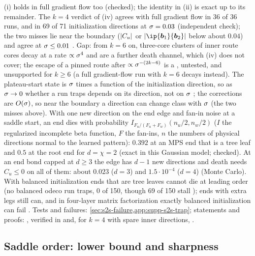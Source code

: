 (i) holds in full gradient flow too (checked); the identity in (ii) is exact up to its remainder. The $k=4$ verdict
of (iv) agrees with full gradient flow in 36 of 36 runs, and in 69 of 71 initialization directions at $\sigma=0.03$
(independent check); the two misses lie near the boundary ($\lvert C_u\rvert$ or $\abs{\ip{\boldsymbol b_1}{\boldsymbol b_2}}$
below about $0.04$) and agree at $\sigma\le0.01$ \empirical. Gap: from
$k=6$ on, three-core clusters of inner route cores decay at a rate $\propto\sigma^4$ and are a further death
channel, which (iv) does not cover; the escape of a pinned route after $\propto\sigma^{-(2k-6)}$ is a \conjecture,
untested, and unsupported for $k\ge6$ (a full gradient-flow run with $k=6$ decays instead). The plateau-start
state is $\sigma$ times a function of the initialization direction, so as $\sigma\to0$ whether a run traps depends
on its direction, not on $\sigma$ \derived; the corrections are $O(\sigma)$, so near the boundary a direction can change
class with $\sigma$ (the two misses above). With one new direction on the end edge and fan-in noise at a saddle start,
an end dies with probability $I_{F_u/(F_u+F_w)}(n_u/2,n_w/2)$ ($I$ the regularized incomplete beta function, $F$
the fan-ins, $n$ the numbers of physical directions normal to the learned pattern): $0.392$ at an MPS end that
is a tree leaf and $0.5$ at the root end for $d=\chi=2$ \proven{} (exact in this Gaussian model; checked). At an
end bond capped at $d\ge3$ the edge has $d-1$ new directions and death needs $C_u\le0$ on all of them: about
$0.023$ ($d=3$) and $1.5\cdot10^{-4}$ ($d=4$) \empirical{} (Monte Carlo). With balanced initialization ends that are
tree leaves cannot die at leading order \derived{} (no balanced odeco run traps, 0 of 150, though 69 of 150
stall \empirical); ends with extra legs still can, and in four-layer matrix factorization exactly balanced
initialization can fail \citep[Thm~2]{luo2025global}. Tests and failures: \cref{sec:s2s-failure,app:supp-s2s-trap};
statements and proofs: , verified in  and, for
$k=4$ with spare inner directions, .

\subsection{Saddle order: lower bound and sharpness}\label{app:saddle-order}

